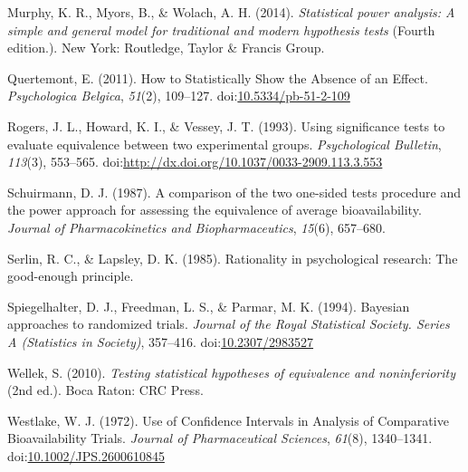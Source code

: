 \documentclass[floatsintext,man]{apa6}
\theoremstyle{definition}
\theoremstyle{definition}
\theoremstyle{definition}
\theoremstyle{remark}
\begin{document}
\hypertarget{ref-murphy_statistical_2014}{}
Murphy, K. R., Myors, B., \& Wolach, A. H. (2014). \emph{Statistical
power analysis: A simple and general model for traditional and modern
hypothesis tests} (Fourth edition.). New York: Routledge, Taylor \&
Francis Group.

\hypertarget{ref-quertemont_how_2011}{}
Quertemont, E. (2011). How to Statistically Show the Absence of an
Effect. \emph{Psychologica Belgica}, \emph{51}(2), 109--127.
doi:\href{https://doi.org/10.5334/pb-51-2-109}{10.5334/pb-51-2-109}

\hypertarget{ref-rogers_using_1993}{}
Rogers, J. L., Howard, K. I., \& Vessey, J. T. (1993). Using
significance tests to evaluate equivalence between two experimental
groups. \emph{Psychological Bulletin}, \emph{113}(3), 553--565.
doi:\href{https://doi.org/http://dx.doi.org/10.1037/0033-2909.113.3.553}{http://dx.doi.org/10.1037/0033-2909.113.3.553}

\hypertarget{ref-schuirmann_comparison_1987}{}
Schuirmann, D. J. (1987). A comparison of the two one-sided tests
procedure and the power approach for assessing the equivalence of
average bioavailability. \emph{Journal of Pharmacokinetics and
Biopharmaceutics}, \emph{15}(6), 657--680.

\hypertarget{ref-serlin_rationality_1985}{}
Serlin, R. C., \& Lapsley, D. K. (1985). Rationality in psychological
research: The good-enough principle.

\hypertarget{ref-spiegelhalter_bayesian_1994}{}
Spiegelhalter, D. J., Freedman, L. S., \& Parmar, M. K. (1994). Bayesian
approaches to randomized trials. \emph{Journal of the Royal Statistical
Society. Series A (Statistics in Society)}, 357--416.
doi:\href{https://doi.org/10.2307/2983527}{10.2307/2983527}

\hypertarget{ref-wellek_testing_2010}{}
Wellek, S. (2010). \emph{Testing statistical hypotheses of equivalence
and noninferiority} (2nd ed.). Boca Raton: CRC Press.

\hypertarget{ref-westlake_use_1972}{}
Westlake, W. J. (1972). Use of Confidence Intervals in Analysis of
Comparative Bioavailability Trials. \emph{Journal of Pharmaceutical
Sciences}, \emph{61}(8), 1340--1341.
doi:\href{https://doi.org/10.1002/JPS.2600610845}{10.1002/JPS.2600610845}
\end{document}
